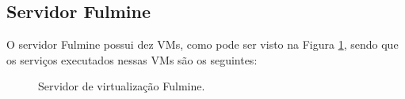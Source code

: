 \subsection{Servidor Fulmine}
\label{section:serv_fulmine}

O servidor Fulmine possui dez \ac{VM}s, como pode ser visto na Figura \ref{fig:servidor_fulmine}, sendo que os serviços executados nessas \ac{VM}s
são os seguintes:

\begin{figure}[h!]
 \centering
 \caption{Servidor de virtualização Fulmine.}
 \label{fig:servidor_fulmine}
\end{figure}

